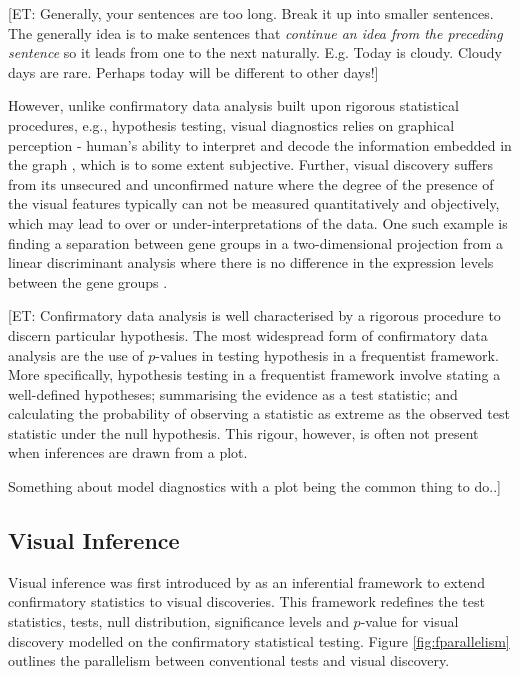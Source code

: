 \documentclass{monashthesis}
\begin{document}
{[}ET: Generally, your sentences are too long. Break it up into smaller sentences. The generally idea is to make sentences that \emph{continue an idea from the preceding sentence} so it leads from one to the next naturally. E.g. Today is cloudy. Cloudy days are rare. Perhaps today will be different to other days!{]}

However, unlike confirmatory data analysis built upon rigorous statistical procedures, e.g., hypothesis testing, visual diagnostics relies on graphical perception - human's ability to interpret and decode the information embedded in the graph \autocite{cleveland_graphical_1984}, which is to some extent subjective. Further, visual discovery suffers from its unsecured and unconfirmed nature where the degree of the presence of the visual features typically can not be measured quantitatively and objectively, which may lead to over or under-interpretations of the data. One such example is finding a separation between gene groups in a two-dimensional projection from a linear discriminant analysis where there is no difference in the expression levels between the gene groups \autocite{roy_chowdhury_using_2015}.

{[}ET: Confirmatory data analysis is well characterised by a rigorous procedure to discern particular hypothesis. The most widespread form of confirmatory data analysis are the use of \(p\)-values in testing hypothesis in a frequentist framework. More specifically, hypothesis testing in a frequentist framework involve stating a well-defined hypotheses; summarising the evidence as a test statistic; and calculating the probability of observing a statistic as extreme as the observed test statistic under the null hypothesis. This rigour, however, is often not present when inferences are drawn from a plot.

Something about model diagnostics with a plot being the common thing to do..{]}

\hypertarget{visual-inference-1}{%
\subsection{Visual Inference}\label{visual-inference-1}}

Visual inference was first introduced by \textcite{buja_statistical_2009} as an inferential framework to extend confirmatory statistics to visual discoveries. This framework redefines the test statistics, tests, null distribution, significance levels and \(p\)-value for visual discovery modelled on the confirmatory statistical testing. Figure \ref{fig:fparallelism} outlines the parallelism between conventional tests and visual discovery.
\end{document}
